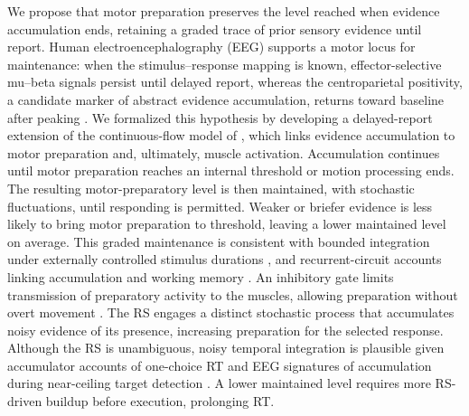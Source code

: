 \documentclass[a4paper,11pt]{article}
\theoremstyle{definition}
\newcommand{\1}{\mathbbm{1}}
\begin{document}
We propose that motor preparation preserves the level reached when evidence accumulation ends, retaining a graded trace of prior sensory evidence until report. Human electroencephalography (EEG) supports a motor locus for maintenance: when the stimulus--response mapping is known, effector-selective mu--beta signals persist until delayed report, whereas the centroparietal positivity, a candidate marker of abstract evidence accumulation, returns toward baseline after peaking \parencites{roggeMotorCorticalSignals2022}{twomeyAbstractEffectorSelectiveDecision2016}. We formalized this hypothesis by developing a delayed-report extension of the continuous-flow model of \textcite{dendauwGatedCascadeDiffusion2024}, which links evidence accumulation to motor preparation and, ultimately, muscle activation. Accumulation continues until motor preparation reaches an internal threshold or motion processing ends. The resulting motor-preparatory level is then maintained, with stochastic fluctuations, until responding is permitted. Weaker or briefer evidence is less likely to bring motor preparation to threshold, leaving a lower maintained level on average. This graded maintenance is consistent with bounded integration under externally controlled stimulus durations \parencite{kianiBoundedIntegrationParietal2008}, and recurrent-circuit accounts linking accumulation and working memory \parencite{wangDecisionMakingRecurrent2008}. An inhibitory gate limits transmission of preparatory activity to the muscles, allowing preparation without overt movement \parencite{dendauwGatedCascadeDiffusion2024}. The RS engages a distinct stochastic process that accumulates noisy evidence of its presence, increasing preparation for the selected response. Although the RS is unambiguous, noisy temporal integration is plausible given accumulator accounts of one-choice RT \parencite{ratcliffDiffusionModelOnechoice2011} and EEG signatures of accumulation during near-ceiling target detection \parencite{oconnellSupramodalAccumulationtoboundSignal2012}. A lower maintained level requires more RS-driven buildup before execution, prolonging RT.
\end{document}
